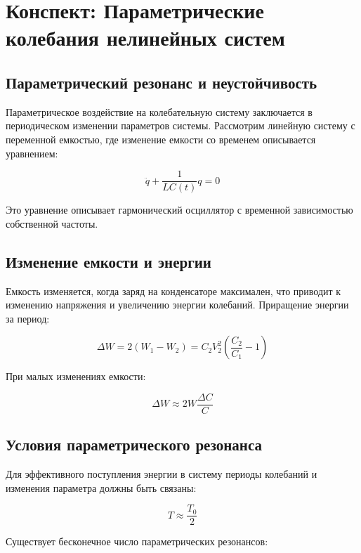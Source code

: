 \documentclass[10pt]{article}
\begin{document}
\section*{Конспект: Параметрические колебания нелинейных систем}

\subsection*{Параметрический резонанс и неустойчивость}
Параметрическое воздействие на колебательную систему заключается в периодическом изменении параметров системы. Рассмотрим линейную систему с переменной емкостью, где изменение емкости со временем описывается уравнением:

\begin{equation*}
\ddot{q}+\frac{1}{L C(t)} q=0
\end{equation*}

Это уравнение описывает гармонический осциллятор с временной зависимостью собственной частоты.

\subsection*{Изменение емкости и энергии}
Емкость изменяется, когда заряд на конденсаторе максимален, что приводит к изменению напряжения и увеличению энергии колебаний. Приращение энергии за период:

\begin{equation*}
\Delta W=2\left(W_{1}-W_{2}\right)=C_{2} V_{2}^{2}\left(\frac{C_{2}}{C_{1}}-1\right)
\end{equation*}

При малых изменениях емкости:

\begin{equation*}
\Delta W \approx 2 W \frac{\Delta C}{C}
\end{equation*}

\subsection*{Условия параметрического резонанса}
Для эффективного поступления энергии в систему периоды колебаний и изменения параметра должны быть связаны:

\begin{equation*}
T \approx \frac{T_{0}}{2}
\end{equation*}

Существует бесконечное число параметрических резонансов:
\end{document}
